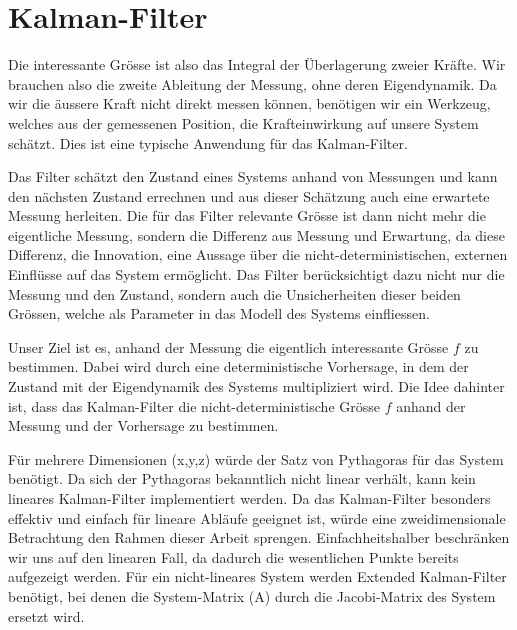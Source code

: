 %
%
%
%
%




\section{Kalman-Filter}
Die interessante Grösse ist also das Integral der Überlagerung zweier Kräfte. 
Wir brauchen also die zweite Ableitung der Messung, ohne deren Eigendynamik.
Da wir die äussere Kraft nicht direkt messen können, benötigen wir ein Werkzeug, welches aus der gemessenen Position, die Krafteinwirkung auf unsere System schätzt. 
Dies ist eine typische Anwendung für das Kalman-Filter.

Das Filter schätzt den Zustand eines Systems anhand von Messungen und kann den nächsten Zustand errechnen und aus dieser Schätzung auch eine erwartete Messung herleiten.
Die für das Filter relevante Grösse ist dann nicht mehr die eigentliche Messung, sondern die Differenz aus Messung und Erwartung, da diese Differenz, die Innovation, eine Aussage über die nicht-deterministischen, externen Einflüsse auf das System ermöglicht.
Das Filter berücksichtigt dazu nicht nur die Messung und den Zustand, sondern auch die Unsicherheiten dieser beiden Grössen, welche als Parameter in das Modell des Systems einfliessen.

Unser Ziel ist es, anhand der Messung die eigentlich interessante Grösse $f$ zu bestimmen. 
Dabei wird durch eine deterministische Vorhersage, in dem der Zustand mit der Eigendynamik des Systems multipliziert wird. 
Die Idee dahinter ist, dass das Kalman-Filter die nicht-deterministische Grösse $f$ anhand der Messung und der Vorhersage zu bestimmen.

Für mehrere Dimensionen (x,y,z) würde der Satz von Pythagoras für das System benötigt.
Da sich der Pythagoras bekanntlich nicht linear verhält, kann kein lineares Kalman-Filter implementiert werden. 
Da das Kalman-Filter besonders effektiv und einfach für lineare Abläufe geeignet ist, würde eine zweidimensionale Betrachtung den Rahmen dieser Arbeit sprengen. 
Einfachheitshalber beschränken wir uns auf den linearen Fall, da dadurch die wesentlichen Punkte bereits aufgezeigt werden. 
Für ein nicht-lineares System werden Extended Kalman-Filter benötigt, bei denen die System-Matrix (A) durch die Jacobi-Matrix des System ersetzt wird.


